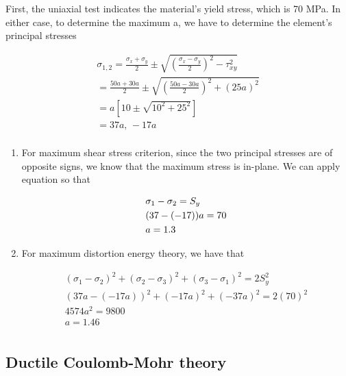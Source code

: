 \documentclass[
10pt,
a4paper,
openany,
svgnames,
]{book} %
\begin{document}
\begin{solution}

  First, the uniaxial test indicates the material’s yield stress, which is 70 MPa. In either case, to determine the maximum a, we have to determine the element’s principal stresses

  \[\begin{gathered}
      \sigma_{1,2} = \frac{\sigma_x + \sigma_y}{2} \pm \sqrt {\left( \frac{\sigma_x - \sigma_y}{2} \right)^2 - \tau _{xy}^2}  \\ 
      = \frac{50a + 30a}{2} \pm \sqrt {\left( \frac{50a - 30a}{2} \right)^2 + (25a)^2}  \\ 
      = a\left[ 10 \pm \sqrt {10^2 + 25^2} \right] \\ 
      = 37a \text{, } - 17a \\ 
    \end{gathered} \]
  
  \begin{enumerate}
  \item For maximum shear stress criterion, since the two principal stresses are of opposite signs, we know that the maximum stress is in-plane. We can apply equation so that
    
    \[\begin{gathered}
        \sigma_1 - \sigma_2 = S_y \hfill \\
        (37 - ( - 17))a = 70 \hfill \\
        a = 1.3 \hfill \\ 
      \end{gathered} \]
    
  \item For maximum distortion energy theory, we have that
    
    \[\begin{gathered}
        (\sigma_1 - \sigma_2)^2 + (\sigma_2 - \sigma_3)^2 + (\sigma_3 - \sigma_1)^2 = 2S_y^2 \\ 
        (37a - ( - 17a))^2 + ( - 17a)^2 + ( - 37a)^2 = 2(70)^2 \\ 
        4574a^2 = 9800 \\ 
        a = 1.46 \\ 
      \end{gathered} \]
    \end{enumerate}
\end{solution}

\subsection{Ductile Coulomb-Mohr theory}
\end{document}
